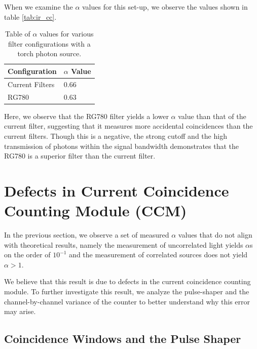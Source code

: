 \documentclass[letterpaper, 11 pt]{article}
\begin{document}
When we examine the $\alpha$ values for this set-up, we observe the values shown in
table \ref{tab:ir_cc}.
\begin{table}[H]
    \centering
    \begin{tabular}{|l|l|}
    \hline
    \textbf{Configuration} & \textbf{$\alpha$ Value} \\ \hline
    Current Filters        & 0.66                   \\ \hline
    RG780                  & 0.63                   \\ \hline
    \end{tabular}
    \caption{Table of $\alpha$ values for various filter configurations with a torch photon source.}
\end{table}\label{tab:ir_cc}

Here, we observe that the RG780 filter yields a lower $\alpha$ value than that of the 
current filter, suggesting that it measures more accidental coincidences than the
current filters. Though this is a negative, the strong cutoff and the high transmission of
photons within the signal bandwidth demonstrates that the RG780 is a superior filter than the current filter.

\section{Defects in Current Coincidence Counting Module (CCM)} \label{sec:ccm_broke}

In the previous section, we observe a set of measured $\alpha$ values that do not align with
theoretical results, namely the measurement of uncorrelated light yields $\alpha$s on the order of $10^{-1}$
and the measurement of correlated sources does not yield $\alpha > 1$.

We believe that this result is due to defects in the current coincidence counting module. To further
investigate this result, we analyze the pulse-shaper and the channel-by-channel variance of the counter
to better understand why this error may arise.

\subsection{Coincidence Windows and the Pulse Shaper}
\end{document}
